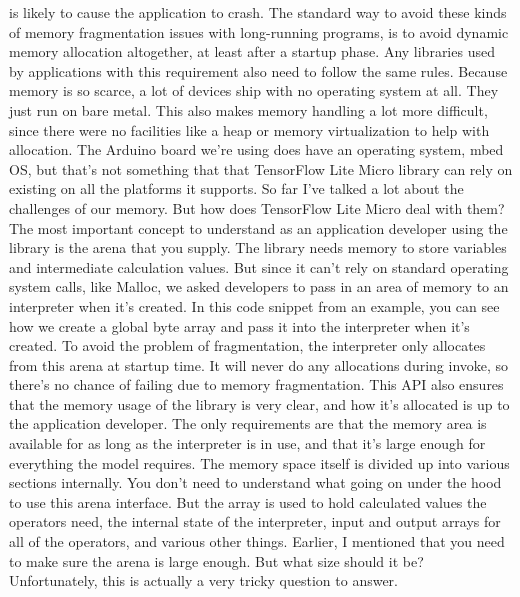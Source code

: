      is likely to cause the application to crash.
     The standard way to avoid these kinds of memory fragmentation issues
     with long-running programs, is to avoid dynamic memory allocation altogether,
     at least after a startup phase.
     Any libraries used by applications with this requirement
     also need to follow the same rules.
     Because memory is so scarce, a lot of devices
     ship with no operating system at all.
     They just run on bare metal.
     This also makes memory handling a lot more difficult,
     since there were no facilities like a heap or memory virtualization
     to help with allocation.
     The Arduino board we're using does have an operating system, mbed OS,
     but that's not something that that TensorFlow Lite Micro
     library can rely on existing on all the platforms it supports.
     So far I've talked a lot about the challenges of our memory.
     But how does TensorFlow Lite Micro deal with them?
     The most important concept to understand as an application developer using
     the library is the arena that you supply.
     The library needs memory to store variables and intermediate calculation
     values.
     But since it can't rely on standard operating system calls, like Malloc,
     we asked developers to pass in an area of memory
     to an interpreter when it's created.
     In this code snippet from an example, you
     can see how we create a global byte array and pass it into the interpreter
     when it's created.
     To avoid the problem of fragmentation, the interpreter
     only allocates from this arena at startup time.
     It will never do any allocations during invoke,
     so there's no chance of failing due to memory fragmentation.
     This API also ensures that the memory usage of the library is very clear,
     and how it's allocated is up to the application developer.
     The only requirements are that the memory area is available for as long
     as the interpreter is in use, and that it's large enough
     for everything the model requires.
     The memory space itself is divided up into various sections internally.
     You don't need to understand what going on under the hood
     to use this arena interface.
     But the array is used to hold calculated values the operators need,
     the internal state of the interpreter, input and output
     arrays for all of the operators, and various other things.
     Earlier, I mentioned that you need to make sure the arena is large enough.
     But what size should it be?
     Unfortunately, this is actually a very tricky question to answer.
